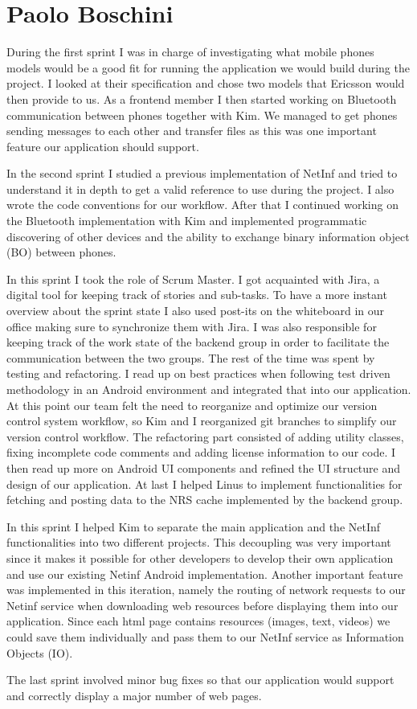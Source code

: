 \section{Paolo Boschini}
During the first sprint I was in charge of investigating what mobile phones models
would be a good fit for running the application we would build during the project.
I looked at their specification and chose two models that Ericsson would then provide to us.
As a frontend member I then started working on Bluetooth communication between phones
together with Kim. We managed to get phones sending messages to each other and transfer
files as this was one important feature our application should support.

In the second sprint I studied a previous implementation of NetInf and tried to understand
it in depth to get a valid reference to use during the project. 
I also wrote the code conventions for our workflow. After that I continued working on the Bluetooth implementation
with Kim and implemented programmatic discovering of other devices and the ability to
exchange binary information object (BO) between phones.

In this sprint I took the role of Scrum Master. I got acquainted with Jira, a digital tool for keeping track of stories and sub-tasks.
To have a more instant overview about the sprint state I also used post-its on the whiteboard in our office making sure to synchronize them with Jira.
I was also responsible for keeping track of the work state of the backend group in order to facilitate the communication between
the two groups. The rest of the time was spent by testing and refactoring. I read up on best practices when following 
test driven methodology in an Android environment and integrated that into our application.
At this point our team felt the need to reorganize and optimize our version control system workflow,
so Kim and I reorganized git branches to simplify our version control workflow.
The refactoring part consisted of adding utility classes, fixing incomplete code comments and adding license
information to our code. I then read up more on Android UI components and refined the UI structure and design of our application.
At last I helped Linus to implement functionalities for fetching and posting data to the NRS cache implemented by the backend group.

In this sprint I helped Kim to separate the main application and the NetInf functionalities into two different projects.
This decoupling was very important since it makes it possible for other developers to develop their own application
and use our existing Netinf Android implementation.
Another important feature was implemented in this iteration, namely the routing of network requests to our Netinf service
when downloading web resources before displaying them into our application. Since each html page contains resources (images, text, videos) we could
save them individually and pass them to our NetInf service as Information Objects (IO).

The last sprint involved minor bug fixes so that our application would support and correctly display a major number of web pages.
